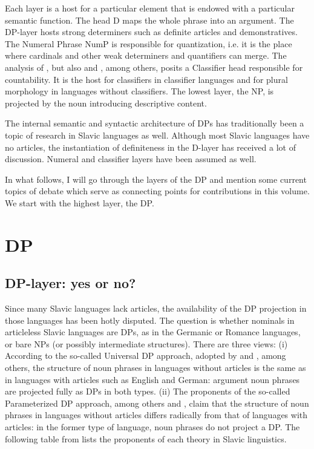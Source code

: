 \documentclass[output=paper,
colorlinks,
citecolor=brown,
newtxmath
]{langscibook}
\begin{document}
Each layer is a host for a particular element that is endowed with a particular semantic function. The head D maps the whole phrase into an argument. The DP-layer hosts strong determiners such as definite articles and demonstratives. The Numeral Phrase NumP is responsible for quantization, i.e. it is the place where cardinals and other weak determiners and quantifiers can merge. The analysis of \cite{Borer2005}, but also \cite{Cheng.Heycock2017} and \cite{Cheng.Sybesma1999}, among others, posits a Classifier head responsible for countability. It is the host for classifiers in classifier languages and for plural morphology in languages without classifiers. The lowest layer, the NP, is projected by the noun introducing descriptive content.

The internal semantic and syntactic architecture of DPs has traditionally been a topic of research in Slavic languages as well. Although most Slavic languages have no articles, the instantiation of definiteness in the D-layer has received a lot of discussion. Numeral and classifier layers have been assumed as well.

In what follows, I will go through the layers of the DP and mention some current topics of debate which serve as connecting points for contributions in this volume. We start with the highest layer, the DP.

\section{DP}
\subsection{DP-layer: yes or no?}

Since many Slavic languages lack articles, the availability of the DP projection in those languages has been hotly disputed. The question is whether nominals in articleless Slavic languages are DPs, as in the Germanic or Romance languages, or bare NPs (or possibly intermediate structures). There are three views: (i) According to the so-called Universal DP approach, adopted by \cite{Longobardi1994} and \cite{Matthewson1998}, among others, the structure of noun phrases in languages without articles is the same as in languages with articles such as English and German: argument noun phrases are projected fully as DPs in both types. (ii) The proponents of the so-called Parameterized DP approach, among others \cite{Chierchia1998} and \cite{Baker2003}, claim that the structure of noun phrases in languages without articles differs radically from that of languages with articles: in the former type of language, noun phrases do not project a DP. The following table from \cite{Veselovska2014} lists the proponents of each theory in Slavic linguistics.
\end{document}
